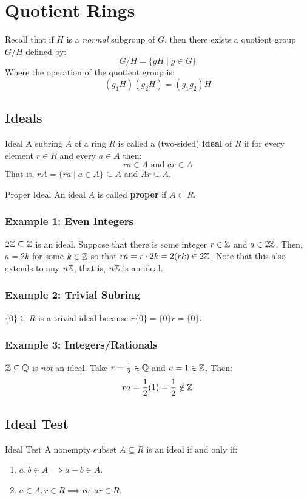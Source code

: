 \documentclass[letterpaper]{article}
\begin{document}
\section{Quotient Rings}
Recall that if $H$ is a \emph{normal} subgroup of $G$, then there exists a quotient group $G / H$ defined by: 
\[G / H = \{gH \mid g \in G\}\]
Where the operation of the quotient group is: 
\[(g_1 H)(g_2 H) = (g_1 g_2) H\]

\subsection{Ideals}
\begin{definition}{Ideal}{}
    A subring $A$ of a ring $R$ is called a (two-sided) \textbf{ideal} of $R$ if for every element $r \in R$ and every $a \in A$ then: 
    \[ra \in A \text{ and } ar \in A\]
    That is, $rA = \{ra \mid a \in A\} \subseteq A$ and $Ar \subseteq A$. 
\end{definition}

\begin{definition}{Proper Ideal}{}
    An ideal $A$ is called \textbf{proper} if $A \subset R$. 
\end{definition}

\subsubsection{Example 1: Even Integers}
$2\mathbb{Z} \subseteq \mathbb{Z}$ is an ideal. Suppose that there is some integer $r \in \mathbb{Z}$ and $a \in 2\mathbb{Z}$. Then, $a = 2k$ for some $k \in \mathbb{Z}$ so that $ra = r \cdot 2k = 2(rk) \in 2\mathbb{Z}$. Note that this also extends to any $n\mathbb{Z}$; that is, $n\mathbb{Z}$ is an ideal. 

\subsubsection{Example 2: Trivial Subring}
$\{0\} \subseteq R$ is a trivial ideal because $r \{0\} = \{0\} r = \{0\}$.

\subsubsection{Example 3: Integers/Rationals}
$\mathbb{Z} \subseteq \mathbb{Q}$ is \emph{not} an ideal. Take $r = \frac{1}{2} \in \mathbb{Q}$ and $a = 1 \in \mathbb{Z}$. Then:
\[ra = \frac{1}{2} (1) = \frac{1}{2} \notin \mathbb{Z}\]

\subsection{Ideal Test}
\begin{theorem}{Ideal Test}{}
    A nonempty subset $A \subseteq R$ is an ideal if and only if: 
    \begin{enumerate}
        \item $a, b \in A \implies a - b \in A$.
        \item $a \in A, r \in R \implies ra, ar \in R$.
    \end{enumerate}
\end{theorem}
\end{document}
